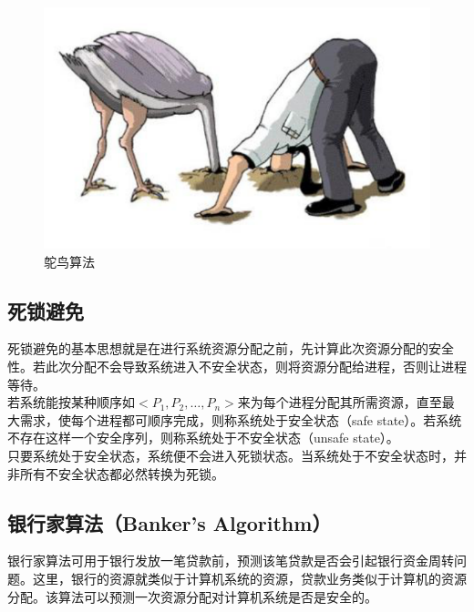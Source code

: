 \begin{figure}[H]
    \centering
    \includegraphics[scale=0.6]{img/C2/2-9/1.png}
    \caption{鸵鸟算法}
\end{figure}

\vspace{0.5cm}

\subsection{死锁避免}

死锁避免的基本思想就是在进行系统资源分配之前，先计算此次资源分配的安全性。若此次分配不会导致系统进入不安全状态，则将资源分配给进程，否则让进程等待。\\

若系统能按某种顺序如$ <P_1, P_2, \dots, P_n> $来为每个进程分配其所需资源，直至最大需求，使每个进程都可顺序完成，则称系统处于安全状态（safe state）。若系统不存在这样一个安全序列，则称系统处于不安全状态（unsafe state）。\\

只要系统处于安全状态，系统便不会进入死锁状态。当系统处于不安全状态时，并非所有不安全状态都必然转换为死锁。\\

\subsection{银行家算法（Banker's Algorithm）}

银行家算法可用于银行发放一笔贷款前，预测该笔贷款是否会引起银行资金周转问题。这里，银行的资源就类似于计算机系统的资源，贷款业务类似于计算机的资源分配。该算法可以预测一次资源分配对计算机系统是否是安全的。\\

